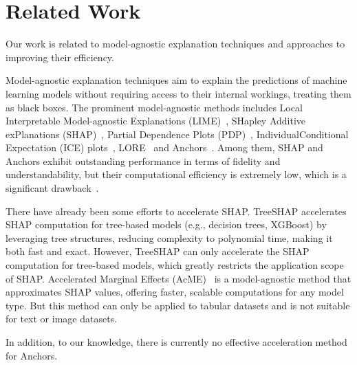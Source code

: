 \section{Related Work}

Our work is related to model-agnostic explanation techniques and approaches to improving their efficiency.

Model-agnostic explanation techniques aim to explain the predictions of machine learning models without requiring access to their internal workings, treating them as black boxes. The prominent model-agnostic methods includes Local Interpretable Model-agnostic Explanations (LIME)~\cite{LIME}, SHapley Additive exPlanations (SHAP)~\cite{SHAP}, Partial Dependence Plots (PDP)~\cite{PDP}, IndividualConditional Expectation (ICE) plots~\cite{ICE}, LORE~\cite{lore} and Anchors~\cite{Anchor}. Among them, SHAP and Anchors exhibit outstanding performance in terms of fidelity and understandability, but their computational efficiency is extremely low, which is a significant drawback~\cite{Compare}.

There have already been some efforts to accelerate SHAP. TreeSHAP\cite{SHAP} accelerates SHAP computation for tree-based models (e.g., decision trees, XGBoost) by leveraging tree structures, reducing complexity to polynomial time, making it both fast and exact. However, TreeSHAP can only accelerate the SHAP computation for tree-based models, which greatly restricts the application scope of SHAP. Accelerated Marginal Effects (AcME)~\cite{ACME} is a model-agnostic method that approximates SHAP values, offering faster, scalable computations for any model type. But this method can only be applied to tabular datasets and is not suitable for text or image datasets.

In addition, to our knowledge, there is currently no effective acceleration method for Anchors.